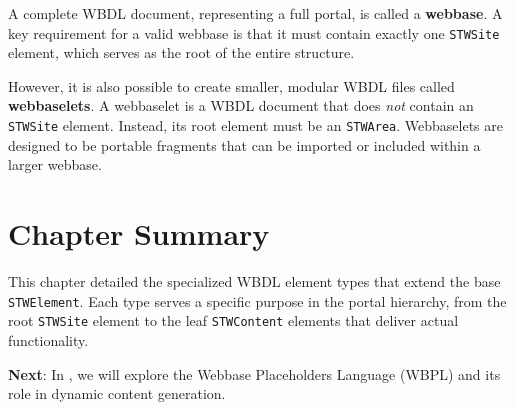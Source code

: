 A complete WBDL document, representing a full portal, is called a \textbf{webbase}. A key requirement for a valid webbase is that it must contain exactly one \texttt{STWSite} element, which serves as the root of the entire structure.

However, it is also possible to create smaller, modular WBDL files called \textbf{webbaselets}. A webbaselet is a WBDL document that does \emph{not} contain an \texttt{STWSite} element. Instead, its root element must be an \texttt{STWArea}. Webbaselets are designed to be portable fragments that can be imported or included within a larger webbase.

\section{Chapter Summary}

This chapter detailed the specialized WBDL element types that extend the base \texttt{STWElement}. Each type serves a specific purpose in the portal hierarchy, from the root \texttt{STWSite} element to the leaf \texttt{STWContent} elements that deliver actual functionality.

\textbf{Next}: In , we will explore the Webbase Placeholders Language (WBPL) and its role in dynamic content generation.
